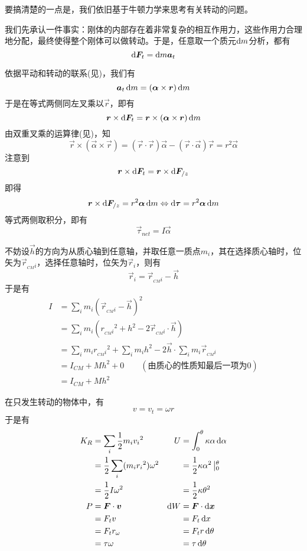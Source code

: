 \chapter[转动动力学]{}
\vspace*{-4ex}
\begin{prove}[Concepts in Dynamics\qquad$\vec{\tau}_{net}=I\vec{\alpha}$]
	要搞清楚的一点是，我们依旧基于牛顿力学来思考有关转动的问题。
	
	我们先承认一件事实：刚体的内部存在着非常复杂的相互作用力，这些作用力合理地分配，最终使得整个刚体可以做转动。于是，任意取一个质元$\dif m$分析，都有\[\dif \vec{F}_t=\dif m\vec{a}_t\]
	
	依据平动和转动的联系(见)，我们有
	\[\vec{a}_t\dif m=(\vec{\alpha}\times\vec{r})\dif m\]
	于是在等式两侧同左叉乘以$\vec{r}$，即有
	\[\vec{r}\times\dif\vec{F}_t= \vec{r}\times(\vec{\alpha}\times\vec{r})\dif m\]
	由双重叉乘的运算律(见)，知
	\[\vec{r}\times(\vec{\alpha}\times\vec{r})=(\vec{r}\cdot\vec{r})\vec{\alpha}-(\vec{r}\cdot\vec{\alpha})\vec{r}=r^2\vec{\alpha}\]
	注意到
	\[\vec{r}\times\dif\vec{F}_t=\vec{r}\times\dif\vec{F}_{/z}\]
	即得
	\[\vec{r}\times\dif\vec{F}_{/z}=r^2\vec{\alpha}\dif m\Leftrightarrow\dif\vec{\tau}=r^2\vec{\alpha}\dif m\]
	等式两侧取积分，即有
	\[\vec{\tau}_{net}=I\vec{\alpha}\]
\end{prove}
\begin{prove}[\itr{Parallel Axis Theorem}{平行轴定理}\qquad$I=I_{CM}+Mh^2$]
	不妨设$\vec{h}$的方向为从质心轴到任意轴，并取任意一质点$m_i$，其在选择质心轴时，位矢为$\vec{r}_{_{CM}i}$，选择任意轴时，位矢为$\vec{r}_i$，则有\[\vec{r}_i=\vec{r}_{_{CM}i}-\vec{h}\]
	于是有
	\begin{align*}
		I&=\sum_{i}m_i(\vec{r}_{_{CM}i}-\vec{h})^2\\
		&=\sum_{i}m_i(r_{_{CM}i}{}^2+h^2-2\vec{r}_{_{CM}i}\cdot\vec{h})\\
		&=\sum_{i}m_ir_{_{CM}i}{}^2+\sum_{i}m_ih^2-2\vec{h}\cdot\sum_{i}m_i\vec{r}_{_{CM}i}\\
		&=I_{CM}+Mh^2+0\qquad(\text{由质心的性质知最后一项为0})\\
		&=I_{CM}+Mh^2
	\end{align*}
\end{prove}
\begin{prove}
	在只发生转动的物体中，有\[v=v_t=\omega r\]于是有
	\begin{align*}
		K_R&=\sum_i\dfrac{1}{2}m_iv_i{}^2&U&=\int_0^{\theta}\kappa\alpha\dif\alpha\\
		&=\dfrac{1}{2}\sum_i(m_i r_i{}^2)\omega^2&&=\dfrac{1}{2}\kappa\alpha^2\left|_0^{\theta}\right.\\
		&=\dfrac{1}{2}I\omega^2&&=\dfrac{1}{2}\kappa\theta^2\\
		P&=\vec{F}\cdot \vec{v}&\dif W&=\vec{F}\cdot\dif \vec{x}\\
		&=F_tv&&=F_t\dif x\\
		&=F_tr_\omega&&=F_tr\dif\theta\\
		&=\tau\omega&&=\tau\dif\theta
	\end{align*}
\end{prove}
